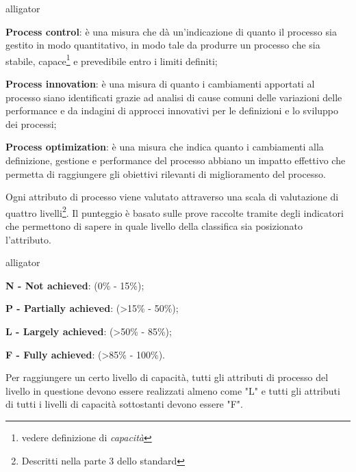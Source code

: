 \begin{labeling}{alligator}
	\item \textbf{Process control}:  è una misura che dà un'indicazione di quanto il processo sia gestito in modo quantitativo, in modo tale da produrre un processo che sia stabile, capace\footnote{vedere definizione di \emph{capacità}} e prevedibile entro i limiti definiti;%
	\item \textbf{Process innovation}: è una misura di quanto i cambiamenti apportati al processo siano identificati grazie ad analisi di cause comuni delle variazioni delle performance e da indagini di approcci innovativi per le definizioni e lo sviluppo dei processi;%
	\item \textbf{Process optimization}: è una misura che indica quanto i cambiamenti alla definizione, gestione e performance del processo abbiano un impatto effettivo che permetta di raggiungere gli obiettivi rilevanti di miglioramento del processo.%
\end{labeling}

Ogni attributo di processo viene valutato attraverso una scala di valutazione di quattro livelli\footnote{Descritti nella parte 3 dello standard}. Il punteggio è basato sulle prove raccolte tramite degli indicatori che permettono di sapere in quale livello della classifica sia posizionato l'attributo. 
\begin{labeling}{alligator}
	\item \textbf{N - Not achieved}: (0\% - 15\%);
	\item \textbf{P - Partially achieved}: (>15\% - 50\%);
	\item \textbf{L - Largely achieved}: (>50\% - 85\%);
	\item \textbf{F - Fully achieved}: (>85\% - 100\%).
\end{labeling}

Per raggiungere un certo livello di capacità, tutti gli attributi di processo del livello in questione devono essere realizzati almeno come "L" e tutti gli attributi di tutti i livelli di capacità sottostanti devono essere "F".

